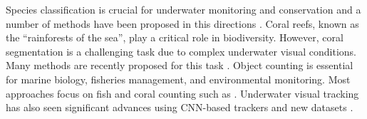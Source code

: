 Species classification is crucial for underwater monitoring and conservation and a number of methods have been proposed in this directions \cite{10612606, Pedersen_2019_CVPR_Workshops, siddiqui2018automatic}.  
Coral reefs, known as the ``rainforests of the sea'', play a critical role in biodiversity. 
However, coral segmentation is a challenging task due to complex underwater visual conditions.
Many methods are recently proposed for this task \cite{zhong2023combining, ziqiang2023coralvos}.
Object counting is essential for marine biology, fisheries management, and environmental monitoring. 
Most approaches focus on fish and coral counting such as \cite{burguera2024deep, babu2023computer, modasshir2018coral}. 
Underwater visual tracking has also seen significant advances using CNN-based trackers and new datasets \cite{9499961, cai2023semi, hao2022umotma, lee2024detection}.

